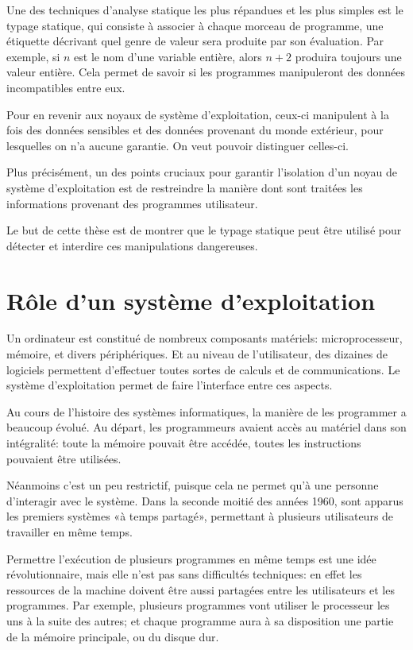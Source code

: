 Une des techniques d'analyse statique les plus répandues et les plus simples est
le typage statique, qui consiste à associer à chaque morceau de programme, une
étiquette décrivant quel genre de valeur sera produite par son évaluation. Par
exemple, si $n$ est le nom d'une variable entière, alors $n + 2$ produira
toujours une valeur entière.
Cela permet de savoir si les programmes manipuleront des données incompatibles
entre eux.

Pour en revenir aux noyaux de système d'exploitation, ceux-ci manipulent à la
fois des données sensibles et des données provenant du monde extérieur, pour
lesquelles on n'a aucune garantie. On veut pouvoir distinguer celles-ci.

Plus précisément, un des points cruciaux pour garantir l'isolation d'un noyau de
système d'exploitation est de restreindre la manière dont sont traitées les
informations provenant des programmes utilisateur.

Le but de cette thèse est de montrer que le typage statique peut être utilisé
pour détecter et interdire ces manipulations dangereuses.

\section{Rôle d'un système d'exploitation}

Un ordinateur est constitué de nombreux composants matériels: microprocesseur,
mémoire, et divers périphériques. Et au niveau de l'utilisateur, des dizaines de
logiciels permettent d'effectuer toutes sortes de calculs et de communications.
Le système d'exploitation permet de faire l'interface entre ces aspects.

Au cours de l'histoire des systèmes informatiques, la manière de les programmer
a beaucoup évolué. Au départ, les programmeurs avaient accès au matériel dans
son intégralité: toute la mémoire pouvait être accédée, toutes les instructions
pouvaient être utilisées.

Néanmoins c'est un peu restrictif, puisque cela ne permet qu'à une personne
d'interagir avec le système. Dans la seconde moitié des années 1960, sont
apparus les premiers systèmes «à temps partagé», permettant à plusieurs
utilisateurs de travailler en même temps.

Permettre l'exécution de plusieurs programmes en même temps est une idée
révolutionnaire, mais elle n'est pas sans difficultés techniques: en effet les
ressources de la machine doivent être aussi partagées entre les utilisateurs et
les programmes. Par exemple, plusieurs programmes vont utiliser le processeur
les uns à la suite des autres; et chaque programme aura à sa disposition une
partie de la mémoire principale, ou du disque dur.

